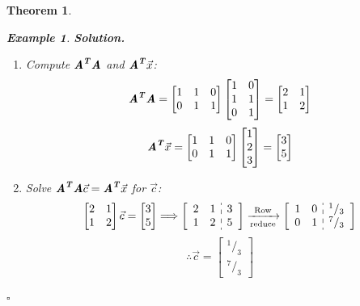 \documentclass[12pt, a4paper]{article}
\newtheorem{thm}{Theorem}[subsection]
\newtheorem{eg}{Example}[subsection]
\newenvironment*{sol}{\indent\textbf{Solution. }}{\hfill{$\square$}\par}
\def\T{{\textbf{\emph{T}}}}
\def\vecx{\vec{x}}
\def\matrixA{\textbf{\emph{A}}}
\begin{document}
\begin{thm}
\begin{eg}
\begin{sol}
\begin{enumerate}
				\item Compute $\matrixA^\T\matrixA$ and $\matrixA^\T\vecx$: \[\matrixA^\T\matrixA=\begin{bmatrix}1&1&0\\0&1&1\end{bmatrix}\begin{bmatrix}1&0\\1&1\\0&1\end{bmatrix}=\begin{bmatrix}2&1\\1&2\end{bmatrix}\]\[\matrixA^\T\vecx=\begin{bmatrix}1&1&0\\0&1&1\end{bmatrix}\begin{bmatrix}1\\2\\3\end{bmatrix}=\begin{bmatrix}3\\5\end{bmatrix}\]
				\item Solve $\matrixA^\T\matrixA\vec{c}=\matrixA^\T\vecx$ for $\vec{c}$: 
				\[\begin{bmatrix}2&1\\1&2\end{bmatrix}\vec{c}=\begin{bmatrix}3\\5\end{bmatrix}\Longrightarrow\left[\begin{array}{c:c}\begin{matrix}2&1\\1&2\end{matrix}&\begin{matrix}3\\5\end{matrix}\end{array}\right]\xrightarrow[\text{reduce}]{\text{Row}}\left[\begin{array}{c:c}\begin{matrix}1&0\\0&1\end{matrix}&\begin{matrix}^1/_3\\^7/_3\end{matrix}\end{array}\right]\]
				\[\therefore\vec{c}=\begin{bmatrix}^1/_3\\^7/_3\end{bmatrix}\]

\end{enumerate}
\end{sol}
\end{eg}
\end{thm}
\end{document}
